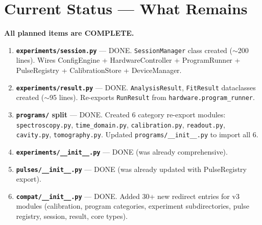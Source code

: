 \documentclass[11pt]{article}
\begin{document}
\section{Current Status --- What Remains}
\label{sec:remaining}

\textbf{All planned items are COMPLETE.}

\begin{enumerate}[label=\textbf{R\arabic*}]
  \item \label{R1} \textbf{\texttt{experiments/session.py}}
        --- \textcolor{green!60!black}{DONE}.
        \texttt{SessionManager} class created ($\sim$200 lines).
        Wires ConfigEngine + HardwareController + ProgramRunner +
        PulseRegistry + CalibrationStore + DeviceManager.

  \item \label{R2} \textbf{\texttt{experiments/result.py}}
        --- \textcolor{green!60!black}{DONE}.
        \texttt{AnalysisResult}, \texttt{FitResult} dataclasses created ($\sim$95 lines).
        Re-exports \texttt{RunResult} from \texttt{hardware.program\_runner}.

  \item \label{R3} \textbf{\texttt{programs/} split}
        --- \textcolor{green!60!black}{DONE}.
        Created 6 category re-export modules:
        \texttt{spectroscopy.py}, \texttt{time\_domain.py},
        \texttt{calibration.py}, \texttt{readout.py},
        \texttt{cavity.py}, \texttt{tomography.py}.
        Updated \texttt{programs/\_\_init\_\_.py} to import all 6.

  \item \label{R4} \textbf{\texttt{experiments/\_\_init\_\_.py}}
        --- \textcolor{green!60!black}{DONE} (was already comprehensive).

  \item \label{R5} \textbf{\texttt{pulses/\_\_init\_\_.py}}
        --- \textcolor{green!60!black}{DONE} (was already updated with PulseRegistry export).

  \item \label{R6} \textbf{\texttt{compat/\_\_init\_\_.py}}
        --- \textcolor{green!60!black}{DONE}.
        Added 30+ new redirect entries for v3 modules (calibration, program categories,
        experiment subdirectories, pulse registry, session, result, core types).


\end{enumerate}
\end{document}
